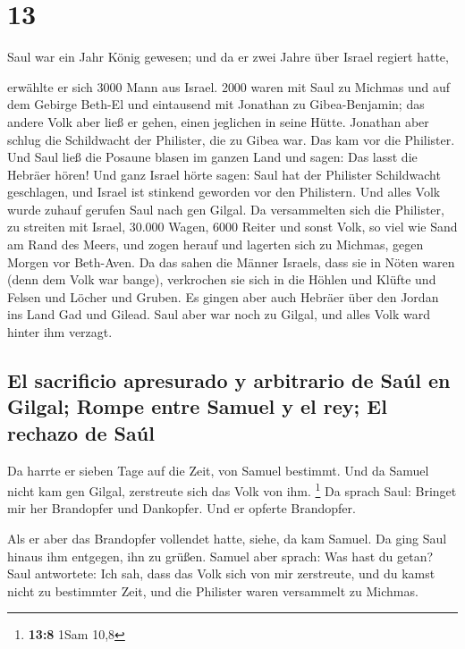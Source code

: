 \hypertarget{section-12}{%
\section{13}\label{section-12}}

 Saul war ein Jahr König gewesen; und da er zwei Jahre
über Israel regiert hatte,

 erwählte er sich 3000 Mann aus Israel. 2000 waren mit
Saul zu Michmas und auf dem Gebirge Beth-El und eintausend mit Jonathan
zu Gibea-Benjamin; das andere Volk aber ließ er gehen, einen jeglichen
in seine Hütte.  Jonathan aber schlug die Schildwacht der
Philister, die zu Gibea war. Das kam vor die Philister. Und Saul ließ
die Posaune blasen im ganzen Land und sagen: Das lasst die Hebräer
hören!  Und ganz Israel hörte sagen: Saul hat der
Philister Schildwacht geschlagen, und Israel ist stinkend geworden vor
den Philistern. Und alles Volk wurde zuhauf gerufen Saul nach gen
Gilgal.  Da versammelten sich die Philister, zu streiten
mit Israel, 30.000 Wagen, 6000 Reiter und sonst Volk, so viel wie Sand
am Rand des Meers, und zogen herauf und lagerten sich zu Michmas, gegen
Morgen vor Beth-Aven.  Da das sahen die Männer Israels,
dass sie in Nöten waren (denn dem Volk war bange), verkrochen sie sich
in die Höhlen und Klüfte und Felsen und Löcher und Gruben.
 Es gingen aber auch Hebräer über den Jordan ins Land Gad
und Gilead. Saul aber war noch zu Gilgal, und alles Volk ward hinter ihm
verzagt.

\hypertarget{el-sacrificio-apresurado-y-arbitrario-de-sauxfal-en-gilgal-rompe-entre-samuel-y-el-rey-el-rechazo-de-sauxfal}{%
\subsection{El sacrificio apresurado y arbitrario de Saúl en Gilgal;
Rompe entre Samuel y el rey; El rechazo de
Saúl}\label{el-sacrificio-apresurado-y-arbitrario-de-sauxfal-en-gilgal-rompe-entre-samuel-y-el-rey-el-rechazo-de-sauxfal}}

 Da harrte er sieben Tage auf die Zeit, von Samuel
bestimmt. Und da Samuel nicht kam gen Gilgal, zerstreute sich das Volk
von ihm. \footnote{\textbf{13:8} 1Sam 10,8}  Da sprach
Saul: Bringet mir her Brandopfer und Dankopfer. Und er opferte
Brandopfer.

 Als er aber das Brandopfer vollendet hatte, siehe, da
kam Samuel. Da ging Saul hinaus ihm entgegen, ihn zu grüßen.
 Samuel aber sprach: Was hast du getan? Saul antwortete:
Ich sah, dass das Volk sich von mir zerstreute, und du kamst nicht zu
bestimmter Zeit, und die Philister waren versammelt zu Michmas.

